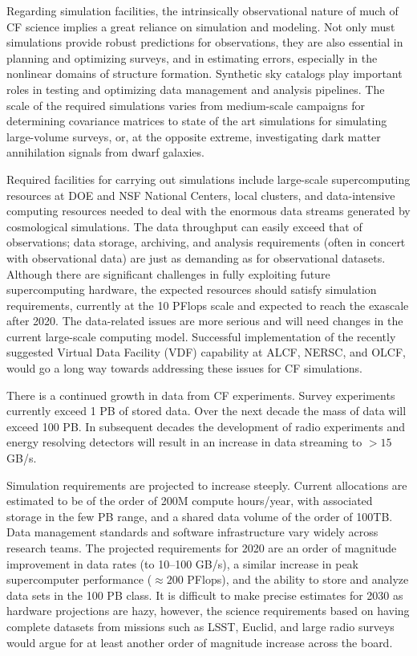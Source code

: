 Regarding simulation facilities, 
the intrinsically observational nature of much of CF
science implies a great reliance on simulation and modeling. Not only
must simulations provide robust predictions for observations, they are
also essential in planning and optimizing surveys, and in estimating
errors, especially in the nonlinear domains of structure
formation. Synthetic sky catalogs play important roles in testing and
optimizing data management and analysis pipelines. The scale of the
required simulations varies from medium-scale campaigns for
determining covariance matrices to state of the art simulations for
simulating large-volume surveys, or, at the opposite extreme,
investigating dark matter annihilation signals from dwarf galaxies.

Required facilities for carrying out simulations include large-scale
supercomputing resources at DOE and NSF National Centers, local
clusters, and data-intensive computing resources needed to deal with
the enormous data streams generated by cosmological simulations. The
data throughput can easily exceed that of observations; data storage,
archiving, and analysis requirements (often in concert with
observational data) are just as demanding as for observational
datasets. Although there are significant challenges in fully
exploiting future supercomputing hardware, the expected resources
should satisfy simulation requirements, currently at the 10 PFlops
scale and expected to reach the exascale after 2020. The data-related
issues are more serious and will need changes in the current
large-scale computing model. Successful implementation of the recently
suggested Virtual Data Facility (VDF) capability at ALCF, NERSC, and
OLCF, would go a long way towards addressing these issues for CF 
simulations.

There is a continued growth in data from CF
experiments. 
Survey experiments currently exceed 1 PB of stored
data. Over the next decade the mass of data will exceed 100 PB. In
subsequent decades the development of radio experiments and energy
resolving detectors will result in an increase in data streaming to
$> 15$ GB/s.

Simulation requirements are projected to increase steeply. Current
allocations are estimated to be of the order of 200M compute
hours/year, with associated storage in the few PB range, and a shared
data volume of the order of 100TB. Data management standards and
software infrastructure vary widely across research teams. The
projected requirements for 2020 are an order of magnitude improvement
in data rates (to 10--100 GB/s), a similar increase in peak
supercomputer performance ($\approx 200$ PFlops), and the ability to store and
analyze data sets in the 100 PB class. It is difficult to make precise
estimates for 2030 as hardware projections are hazy, however, the
science requirements based on having complete datasets from missions
such as LSST, Euclid, and large radio surveys would argue for at least
another order of magnitude increase across the board.


